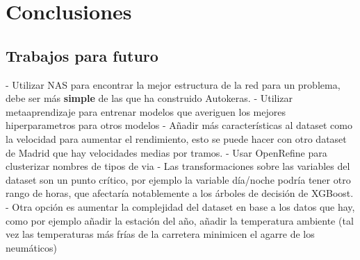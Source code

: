 
\chapter{Conclusiones}
\label{conclusiones}



\section{Trabajos para futuro}

	- Utilizar NAS para encontrar la mejor estructura de la red para un problema, debe ser más \textbf{simple} de las que ha construido Autokeras.
	- Utilizar metaaprendizaje para entrenar modelos que averiguen los mejores hiperparametros para otros modelos
	- Añadir más características al dataset como la velocidad para aumentar el rendimiento, esto se puede hacer con otro dataset de Madrid que hay velocidades medias por tramos.
	- Usar OpenRefine para clusterizar nombres de tipos de via
	- Las transformaciones sobre las variables del dataset son un punto crítico, por ejemplo la variable día/noche podría tener otro rango de horas, que afectaría notablemente a los árboles de decisión de XGBoost.
	- Otra opción es aumentar la complejidad del dataset en base a los datos que hay, como por ejemplo añadir la estación del año, añadir la temperatura ambiente (tal vez las temperaturas más frías de la carretera minimicen el agarre de los neumáticos)